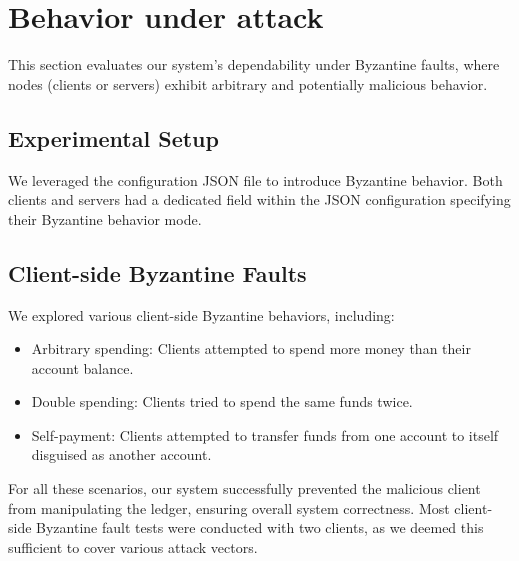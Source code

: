 \section{Behavior under attack}

This section evaluates our system's dependability under Byzantine faults, where nodes (clients or servers) exhibit arbitrary and potentially malicious behavior.

\subsection{Experimental Setup}

We leveraged the configuration JSON file to introduce Byzantine behavior. Both clients and servers had a dedicated field within the JSON configuration specifying their Byzantine behavior mode.

\subsection{Client-side Byzantine Faults} We explored various client-side Byzantine behaviors, including:
    \begin{itemize}
        \item Arbitrary spending: Clients attempted to spend more money than their account balance.
        \item Double spending: Clients tried to spend the same funds twice.
        \item Self-payment: Clients attempted to transfer funds from one account to itself disguised as another account.
    \end{itemize}

For all these scenarios, our system successfully prevented the malicious client from manipulating the ledger, ensuring overall system correctness. Most client-side Byzantine fault tests were conducted with two clients, as we deemed this sufficient to cover various attack vectors.

